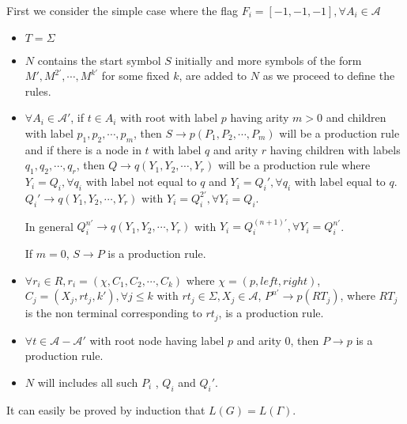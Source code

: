 First we consider the simple case where the flag $F_i=[-1,-1,-1], \forall A_i\in\mathcal{A}$ 
\begin{itemize}
	\item $T=\Sigma$
	\item $N$ contains the start symbol  $S$ initially and more symbols of the form $M',M^{2'},\cdots , M^{k'}$ for some fixed $k$, are added to $N$ 
		as we proceed to define the rules. 
	\item 	$\forall A_i\in\mathcal{A}'$, if $t\in A_i$ with root with label $p$ having arity $m>0$ and children with label $p_1,p_2,\cdots ,p_m$, 
		then \hbox{$S\rightarrow p(P_1,P_2,\cdots ,P_m)$} 
		will be a production rule and if there is a node in $t$ with label $q$ and arity $r$  having children with labels $q_1,q_2,\cdots ,q_r$, 
		then \hbox{$Q\rightarrow q(Y_1,Y_2,\cdots ,Y_r)$} will be a production rule where $Y_i=Q_i, \forall q_i$ with label not equal to $q$ 
		and $Y_i=Q_i', \forall q_i$ with label equal to $q$. \hbox{$Q_i'\rightarrow q(Y_1,Y_2,\cdots ,Y_r)$} with \hbox{$Y_i=Q_i^{2'},
		\forall Y_i=Q_i$}.

		In general \hbox{$Q_i^{n'}\rightarrow q(Y_1,Y_2,\cdots ,Y_r)$} 	with  $Y_i=Q_i^{(n+1)'}, \forall Y_i=Q_i^{n'}$. 
		
		If $m=0$, \hbox{$S\rightarrow P$} is a production rule.

	\item	$\forall r_i\in R, r_i=(\chi,C_1,C_2,\cdots ,C_k)$ where $\chi = (p,left,right)$, $C_j=(X_j,rt_j,k'), \forall j\leq k$ with 
		$rt_j\in \Sigma , X_j\in \mathcal{A}$, \hbox{$P^{n'}\rightarrow p(RT_j)$}, where $RT_j$ is the non terminal corresponding to $rt_j$, 
		is a production rule.
		
	\item	$\forall t\in \mathcal{A}-\mathcal{A'}$ with  root node having label $p$ and arity 0, then \hbox{$P\rightarrow p$} is a production rule.

	\item	$N$ will includes all such $P_i$ , $Q_i$ and $Q_i'$.
\end{itemize}
It can easily be proved by induction that $L(G)=L(\Gamma)$.
